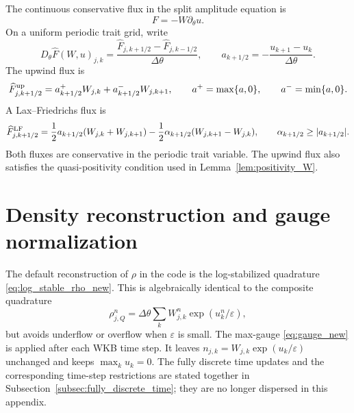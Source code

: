 \documentclass[11pt]{article}
\begin{document}
The continuous conservative flux in the split amplitude equation is
\[
    F=-W\partial_\theta u.
\]
On a uniform periodic trait grid, write
\[
    D_\theta\widehat F(W,u)_{j,k}
    =\frac{\widehat F_{j,k+1/2}-\widehat F_{j,k-1/2}}{\Delta\theta},
    \qquad
    a_{k+1/2}=-\frac{u_{k+1}-u_k}{\Delta\theta}.
\]
The upwind flux is
\begin{equation}\label{eq:app_upwind_flux_new}
    \widehat F^{\rm up}_{j,k+1/2}
    =a_{k+1/2}^+ W_{j,k}+a_{k+1/2}^- W_{j,k+1},
    \qquad
    a^+=\max\{a,0\},
    \qquad
    a^-=\min\{a,0\}.
\end{equation}
A Lax--Friedrichs flux is
\begin{equation}\label{eq:app_LF_flux_new}
    \widehat F^{\rm LF}_{j,k+1/2}
    =\frac{1}{2}a_{k+1/2}(W_{j,k}+W_{j,k+1})
    -\frac{1}{2}\alpha_{k+1/2}(W_{j,k+1}-W_{j,k}),
    \qquad
    \alpha_{k+1/2}\ge |a_{k+1/2}|.
\end{equation}
Both fluxes are conservative in the periodic trait variable.  The upwind flux also satisfies the quasi-positivity condition used in Lemma~\ref{lem:positivity_W}.


\section{Density reconstruction and gauge normalization}\label{app:reconstruction}

The default reconstruction of \(\rho\) in the code is the log-stabilized quadrature \eqref{eq:log_stable_rho_new}. This is algebraically identical to the composite quadrature
\[
    \rho_{j,Q}^n=\Delta\theta\sum_k W_{j,k}^n\exp(u_k^n/\varepsilon),
\]
but avoids underflow or overflow when \(\varepsilon\) is small. The max-gauge \eqref{eq:gauge_new} is applied after each WKB time step. It leaves \(n_{j,k}=W_{j,k}\exp(u_k/\varepsilon)\) unchanged and keeps \(\max_k u_k=0\). {\color{red} The fully discrete time updates and the corresponding time-step restrictions are stated together in Subsection~\ref{subsec:fully_discrete_time}; they are no longer dispersed in this appendix.}
\end{document}
